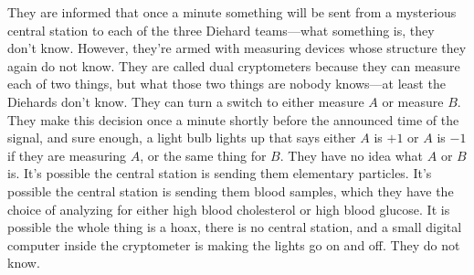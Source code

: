 \documentclass[12pt,nofootinbib]{revtex4}
\begin{document}
They are informed that once a minute something will be sent from a mysterious central station to each of the three Diehard teams---what something is, they don't know. However, they're armed with measuring devices whose structure they again do not know. They are called dual cryptometers because they can measure each of two things, but what those two things are nobody knows---at least the Diehards don't know. They can turn a switch to either measure $A$ or measure $B$. They make this decision once a minute shortly before the announced time of the signal, and sure enough, a light bulb lights up that says either $A$ is $+1$ or $A$ is $-1$ if they are measuring $A$, or the same thing for $B$. They have no idea what $A$ or $B$ is. It's possible the central station is sending them elementary particles. It's possible the central station is sending them blood samples, which they have the choice of analyzing for either high blood cholesterol or high blood glucose. It is possible the whole thing is a hoax, there is no central station, and a small digital computer inside the cryptometer is making the lights go on and off. They do not know.
\end{document}
